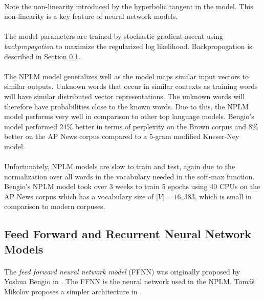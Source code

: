 \paragraph{}
Note the non-linearity introduced by the hyperbolic tangent in the model. This non-linearity is a key feature of neural network models.
\paragraph{}
The model parameters are trained by stochastic gradient ascent using \emph{backpropagation} to maximize the regularized log likelihood. Backpropogation is described in Section \ref{sec:FFNNRNN}.
\paragraph{}
The NPLM model generalizes well as the model maps similar input vectors to similar outputs. Unknown words that occur in similar contexts as training words will have similar distributed vector representations. The unknown words will therefore have probabilities close to the known words.  Due to this, the NPLM model performs very well in comparison to other top language models. Bengio's model performed 24\% better in terms of perplexity on the Brown corpus and 8\% better on the AP News corpus compared to a 5-gram modified Kneser-Ney model.
\paragraph{}
Unfortunately, NPLM models are slow to train and test, again due to the normalization over all words in the vocabulary needed in the soft-max function. Bengio's NPLM model took over 3 weeks to train 5 epochs using 40 CPUs on the AP News corpus which has a vocabulary size of $|V|=16,383$, which is small in comparison to modern corpuses.

\subsection{Feed Forward and Recurrent Neural Network Models} \label{sec:FFNNRNN}
\paragraph{}
The \emph{feed forward neural network model} (FFNN) was originally proposed by Yoshua Bengio in \cite{Bengio2003}. The FFNN is the neural network used in the NPLM. Tom{\'a}\v{s} Mikolov proposes a simpler architecture in \cite{Mikolov2009}.

